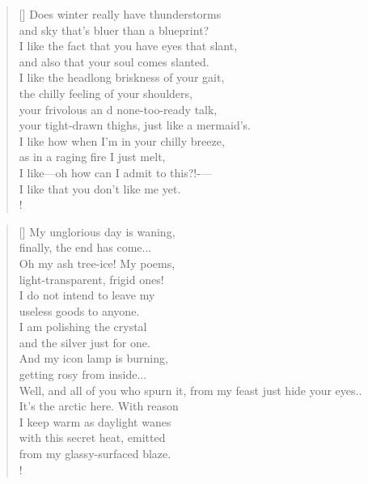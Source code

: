 \documentclass[]{article}
\newcommand{\poemauthorcenter}[1]{\nopagebreak{\centering\footnotesize\textsc{#1}\par}}
\begin{document}
\vspace*{0.03\textheight}
\settowidth{\versewidth}{Does winter really have thunderstorms }
\begin{verse}[\versewidth]
Does winter really have thunderstorms\\
and sky that's bluer than a blueprint?\\
I like the fact that you have eyes that slant,\\
and also that your soul comes slanted.\\
I like the headlong briskness of your gait,\\
the chilly feeling of your shoulders,\\
your frivolous an d none-too-ready talk,\\
your tight-drawn thighs, just like a mermaid's.\\
I like how when I'm in your chilly breeze,\\
as in a raging fire I just melt,\\
I like—oh how can I admit to this?!-— \\
I like that you don't like me yet.\\!
\end{verse}
\poemauthorcenter{\textit{1931}}
\bigskip \bigskip

\settowidth{\versewidth}{Oh my ashtree-ice! My poems, }
\begin{verse}[\versewidth]
My unglorious day is waning,\\
finally, the end has come... \\
Oh my ash tree-ice! My poems,\\
light-transparent, frigid ones!\\
I do not intend to leave my\\
useless goods to anyone.\\
I am polishing the crystal\\
and the silver just for one.\\
And my icon lamp is burning,\\
getting rosy from inside... \\
Well, and all of you who spurn it,
from my feast just hide your eyes.. \\
It's the arctic here. With reason\\
I keep warm as daylight wanes\\
with this secret heat, emitted\\
from my glassy-surfaced blaze.\\!
\end{verse}
\newpage 
\end{document}
